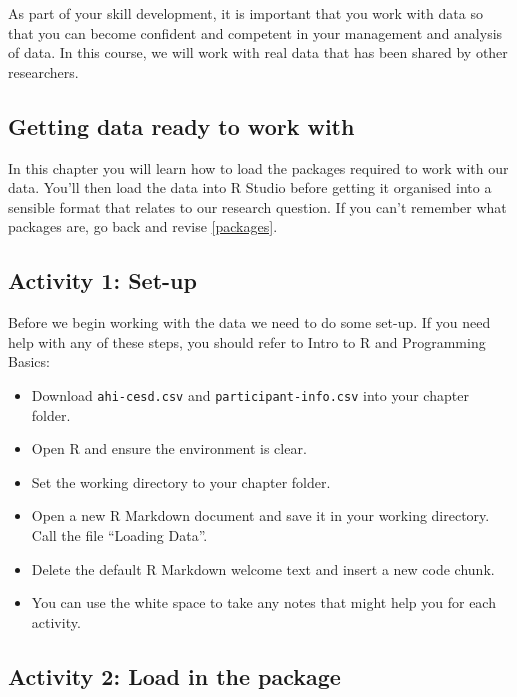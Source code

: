 \documentclass[]{book}
\providecommand{\tightlist}{%
  \setlength{\itemsep}{0pt}\setlength{\parskip}{0pt}}
\begin{document}
As part of your skill development, it is important that you work with data so that you can become confident and competent in your management and analysis of data. In this course, we will work with real data that has been shared by other researchers.

\hypertarget{getting-data-ready-to-work-with}{%
\subsection{Getting data ready to work with}\label{getting-data-ready-to-work-with}}

In this chapter you will learn how to load the packages required to work with our data. You'll then load the data into R Studio before getting it organised into a sensible format that relates to our research question. If you can't remember what packages are, go back and revise \ref{packages}.

\hypertarget{activity-1-set-up}{%
\subsection{Activity 1: Set-up}\label{activity-1-set-up}}

Before we begin working with the data we need to do some set-up. If you need help with any of these steps, you should refer to Intro to R and Programming Basics:

\begin{itemize}
\tightlist
\item
  Download \texttt{ahi-cesd.csv} and \texttt{participant-info.csv} into your chapter folder.\\
\item
  Open R and ensure the environment is clear.
\item
  Set the working directory to your chapter folder.\\
\item
  Open a new R Markdown document and save it in your working directory. Call the file ``Loading Data''.\\
\item
  Delete the default R Markdown welcome text and insert a new code chunk.\\
\item
  You can use the white space to take any notes that might help you for each activity.
\end{itemize}

\hypertarget{activity-2-load-in-the-package}{%
\subsection{Activity 2: Load in the package}\label{activity-2-load-in-the-package}}
\end{document}
